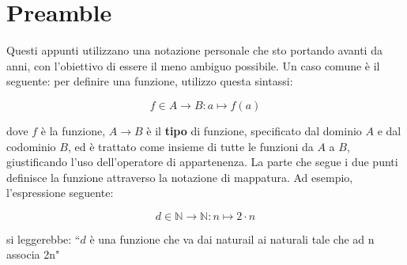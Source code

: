 
\chapter{Preamble}
Questi appunti utilizzano una notazione personale che sto portando avanti da anni, con l'obiettivo di essere il meno ambiguo possibile. Un caso comune è il seguente: per definire una funzione, utilizzo questa sintassi:

\begin{equation}
f \in A \to B : a \mapsto f(a)
\end{equation}

dove $f$ è la funzione, $A \to B$ è il \textbf{tipo} di funzione, specificato dal dominio $A$ e dal codominio $B$, ed è trattato come insieme di tutte le funzioni da $A$ a $B$, giustificando l'uso dell'operatore di appartenenza. La parte che segue i due punti definisce la funzione attraverso la notazione di mappatura.
Ad esempio, l'espressione seguente:

\begin{equation}
d \in \mathbb{N} \to \mathbb{N} : n \mapsto 2\cdot n
\end{equation}

si leggerebbe: ``$d$ è una funzione che va dai naturail ai naturali tale che ad n associa 2n"